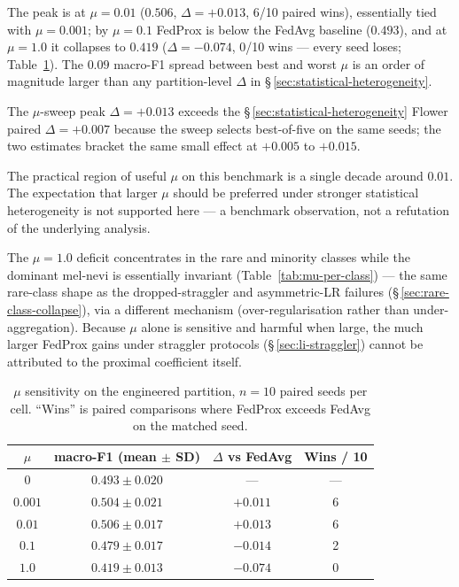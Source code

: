 \documentclass[11pt,a4paper]{report}
\begin{document}
The peak is at $\mu = 0.01$ ($0.506$, $\Delta = +0.013$, 6/10 paired wins),
essentially tied with $\mu = 0.001$; by $\mu = 0.1$ FedProx is below the FedAvg
baseline ($0.493$), and at $\mu = 1.0$ it collapses to $0.419$
($\Delta = -0.074$, 0/10 wins --- every seed loses; Table~\ref{tab:mu-sweep}).
The $0.09$ macro-F1 spread between best and worst $\mu$ is an order of magnitude
larger than any partition-level $\Delta$ in
\S\,\ref{sec:statistical-heterogeneity}.

The $\mu$-sweep peak $\Delta = +0.013$ exceeds the
\S\,\ref{sec:statistical-heterogeneity} Flower paired $\Delta = +0.007$
because the sweep selects best-of-five on the same seeds; the two estimates
bracket the same small effect at $+0.005$ to $+0.015$.

The practical region of useful $\mu$ on this benchmark is a single decade
around $0.01$. The expectation that larger $\mu$ should be preferred under
stronger statistical heterogeneity is not supported here --- a benchmark
observation, not a refutation of the underlying analysis.

The $\mu = 1.0$ deficit concentrates in the rare and minority classes while the
dominant mel-nevi is essentially invariant (Table~\ref{tab:mu-per-class}) --- the
same rare-class shape as the dropped-straggler and asymmetric-LR failures
(\S\,\ref{sec:rare-class-collapse}), via a different mechanism
(over-regularisation rather than under-aggregation). Because $\mu$ alone is
sensitive and harmful when large, the much larger FedProx gains under straggler
protocols (\S\,\ref{sec:li-straggler}) cannot be attributed to the proximal
coefficient itself.



\begin{table}[H]
\centering
\caption{$\mu$ sensitivity on the engineered partition, $n=10$ paired
seeds per cell. ``Wins'' is paired comparisons where FedProx exceeds
FedAvg on the matched seed.}
\label{tab:mu-sweep}
\begin{tabular}{cccc}
\hline
$\mu$    & macro-F1 (mean $\pm$ SD)   & $\Delta$ vs FedAvg & Wins / 10 \\
\hline
$0$      & $0.493 \pm 0.020$          & ---               & ---  \\
$0.001$  & $0.504 \pm 0.021$          & $+0.011$          & 6    \\
$0.01$   & $\mathbf{0.506 \pm 0.017}$ & $\mathbf{+0.013}$ & 6    \\
$0.1$    & $0.479 \pm 0.017$          & $-0.014$          & 2    \\
$1.0$    & $0.419 \pm 0.013$          & $-0.074$          & 0    \\
\hline
\end{tabular}
\end{table}
\end{document}
